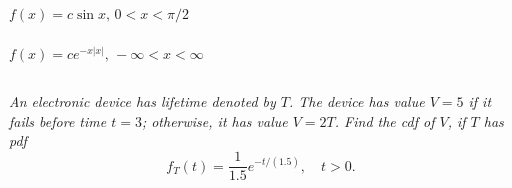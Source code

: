 \documentclass[12pt]{amsart}
\begin{document}
	\subsubsection{}
	\( f(x) = c\sin x,\, 0<x<\pi/2 \)
	
	\subsubsection{}
	\( f(x) = ce^{-x|x|},\, -\infty<x<\infty \)
	


\subsection{} %
\textit{An electronic device has lifetime denoted by $T$. The device has value $V = 5$ if it fails
	before time $t = 3$; otherwise, it has value $V = 2T$. Find the cdf of $V$, if $T$ has pdf}
	\[ f_T(t) = \frac{1}{1.5}e^{-t/(1.5)},\quad t>0.\]
\end{document}
